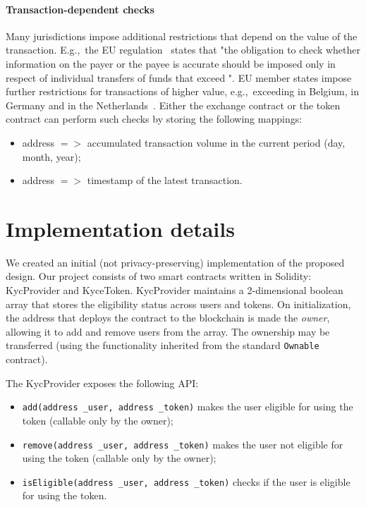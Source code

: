 \paragraph{Transaction-dependent checks}

Many jurisdictions impose additional restrictions that depend on the value of the transaction.
E.g.,~the EU regulation~\cite{EU847} states that "the obligation to check whether information on the payer or the payee is accurate should \textelp{} be imposed only in respect of individual transfers of funds that exceed ".
EU member states impose further restrictions for transactions of higher value, e.g.,~exceeding  in Belgium,  in Germany and in the Netherlands~\cite{PWC2015}.
Either the exchange contract or the token contract can perform such checks by storing the following mappings:
\begin{itemize}
	\item address $=>$ accumulated transaction volume in the current period (day, month, year);
	\item address $=>$ timestamp of the latest transaction. 
\end{itemize}




\section{Implementation details}

We created an initial (not privacy-preserving) implementation of the proposed design.
Our project consists of two smart contracts written in Solidity: KycProvider and KyceToken.
KycProvider maintains a 2-dimensional boolean array that stores the eligibility status across users and tokens.
On initialization, the address that deploys the contract to the blockchain is made the \textit{owner}, allowing it to add and remove users from the array.
The ownership may be transferred (using the functionality inherited from the standard \texttt{Ownable} contract).

The KycProvider exposes the following API:

\begin{itemize}
	\item \texttt{add(address \_user, address \_token)} makes the user eligible for using the token (callable only by the owner);
	\item \texttt{remove(address \_user, address \_token)} makes the user not eligible for using the token (callable only by the owner);
	\item \texttt{isEligible(address \_user, address \_token)} checks if the user is eligible for using the token.
\end{itemize}

